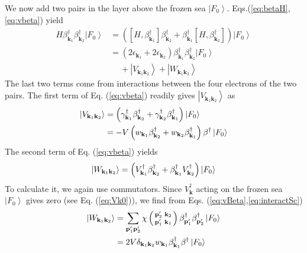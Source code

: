 \documentclass[epj]{svjour}
\newcommand{\vk}{\ensuremath{\mathbf{k}}}
\newcommand{\vp}{\ensuremath{\mathbf{p}}}
\begin{document}
We now add two pairs in the layer above  the frozen sea $\left|F_0\right>$. Eqs.(\ref{eq:betaH},\ref{eq:vbeta}) yield 
\begin{equation}  \label{eq:SchTwo}
\begin{split}
H\beta^{\dagger}_{\mathbf{k} _1}\beta^{\dagger}_{\mathbf{k}
_2}\left|F_0\right>   &=\left(\left[H,\beta^{\dagger}_{\mathbf{k} _1}\right]
\beta^{\dagger}_{\mathbf{k} _2}+\beta^{\dagger}_{\mathbf{k} _1}\left[%
H,\beta^{\dagger}_{\mathbf{k} _2}\right]  \right) \left|F_0\right>   \\
&=\left(2\epsilon_{\mathbf{k} _1}+2\epsilon_{\mathbf{k} _2}\right)
\beta^{\dagger}_{\mathbf{k} _1}\beta^{\dagger}_{\mathbf{k}
_2}\left|F_0\right>\\
&\quad\:   +\left|V_{\mathbf{k} _1\mathbf{k} _2}\right>+\left|W_{\mathbf{k} _1\mathbf{k} _2}\right>  
\end{split}%
\end{equation}
The last two terms come from interactions between the four electrons of the two pairs.  The first term of Eq. (\ref{eq:vbeta}) readily gives $\left|V_{\mathbf{k} _1\mathbf{k} _2}\right> $ as 
\begin{equation}
\begin{split}
\left|V_{\mathbf{k} _1\mathbf{k} _2}\right>& =\left(\gamma^{\dagger}_{\mathbf{%
k} _1}\beta^{\dagger}_{\mathbf{k} _2}+\gamma^{\dagger}_{\mathbf{k}
_2}\beta^{\dagger}_{\mathbf{k} _1}\right) \left|F_0\right> \\
&=-V\left(w_{\mathbf{k} _1}\beta^{\dagger}_{\mathbf{k} _2}+w_{\mathbf{k}
_2}\beta^{\dagger}_{\mathbf{k} _1}\right)\beta^\dagger \left|F_0\right>  
\end{split}
\end{equation}
The second term of Eq. (\ref{eq:vbeta}) yields
\begin{equation}
\left|W_{\mathbf{k} _1\mathbf{k} _2}\right> =\left(V^{\dagger}_{\mathbf{%
k} _1}\beta^{\dagger}_{\mathbf{k} _2}+\beta^{\dagger}_{\mathbf{k}
_1}V^{\dagger}_{\mathbf{k} _2}\right) \left|F_0\right> 
\end{equation}
To calculate it, we again use commutators.  Since  $V^{\dagger}_{\mathbf{k}}$ acting on the frozen sea $\left|F_0\right>$ gives zero (see Eq. (\ref{eq:Vk0})), we find from Eqs. (\ref{eq:vBeta},\ref{eq:interactSc}) 
\begin{equation}\label{eq:omega2}
\begin{split}
\left|W_{\mathbf{k} _1\mathbf{k} _2}\right>&=\sum_{\mathbf{p} ^{\prime}_1\mathbf{p}
^{\prime}_2}\chi\left(\begin{smallmatrix}\vp'_2&\vk_2\\\vp'_1&\vk_1%
\end{smallmatrix}\right)  \beta^{\dagger}_{\mathbf{p} ^{\prime}_1}\beta^{%
\dagger}_{\mathbf{p} ^{\prime}_2}\left|F_0\right> \\
&=2V\delta_{\mathbf{k} _1\mathbf{k} _2}w_{\mathbf{k} _1}\beta^{\dagger}_{
\mathbf{k} _1} \beta^{\dagger}\left|F_0\right> 
\end{split}
\end{equation}
\end{document}
